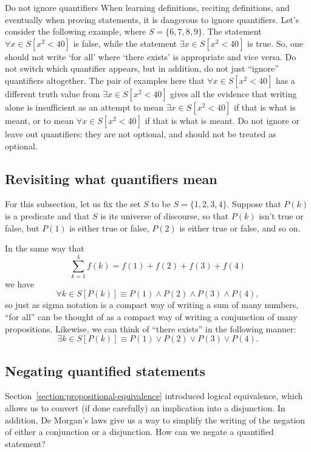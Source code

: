 \documentclass{book}
\theoremstyle{ekimcustom}
\begin{document}
\begin{bwarning}{Do not ignore quantifiers}{}
When learning definitions, reciting definitions, and eventually when proving statements, it is dangerous to ignore quantifiers. Let's consider the following example, where $S = \{6,7,8,9\}$. The statement $\forall x \in S [x^2 < 40]$ is false, while the statement $\exists x \in S [x^2 < 40]$ is true. So, one should not write `for all' where `there exists' is appropriate and vice versa. Do not switch which quantifier appears, but in addition, do not just ``ignore'' quantifiers altogether. The pair of examples here that $\forall x \in S [x^2 < 40]$ has a different truth value from $\exists x \in S [x^2 < 40]$ gives all the evidence that writing  alone is insufficient as an attempt to mean $\exists x \in S [x^2 < 40]$ if that is what is meant, or to mean $\forall x \in S [x^2 < 40]$ if that is what is meant. Do not ignore or leave out quantifiers: they are not optional, and should not be treated as optional.
\end{bwarning}


\subsection{Revisiting what quantifiers mean}

For this subsection, let us fix the set $S$ to be $S = \{1,2,3,4\}$. Suppose that $P(k)$ is a predicate and that $S$ is its universe of discourse, so that $P(k)$ isn't true or false, but $P(1)$ is either true or false, $P(2)$ is either true or false, and so on.

In the same way that
\[ \sum_{k=1}^4 f(k) = f(1) + f(2) + f(3) + f(4)\]
we have
\[ \forall k \in S [P(k)] \equiv P(1) \wedge P(2) \wedge P(3) \wedge P(4),\]
so just as sigma notation is a compact way of writing a sum of many numbers, ``for all'' can be thought of as a compact way of writing a conjunction of many propositions. Likewise, we can think of ``there exists'' in the following manner:
\[ \exists k \in S [P(k)] \equiv P(1) \vee P(2) \vee P(3) \vee P(4).\]


\subsection{Negating quantified statements}

Section~\ref{section:propositional-equivalence} introduced logical equivalence, which allows us to convert (if done carefully) an implication into a disjunction. In addition, De Morgan's laws give us a way to simplify the writing of the negation of either a conjunction or a disjunction. How can we negate a quantified statement?
\end{document}
